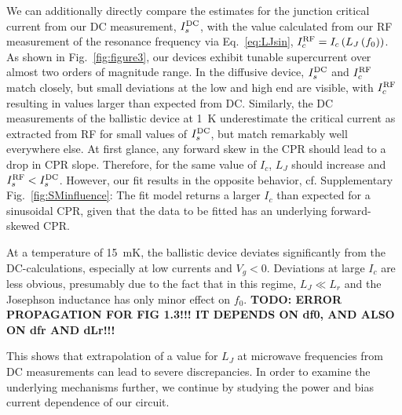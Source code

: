 We can additionally directly compare the estimates for the junction critical current from our DC measurement, $I_s^{\rm DC}$, with the value calculated from our RF measurement of the resonance frequency via Eq.~\ref{eq:LJsin}, $I_c^{\rm RF}=I_c\left(L_J\left(f_0\right)\right)$. 
%
As shown in Fig.~\ref{fig:figure3}, our devices exhibit tunable supercurrent over almost two orders of magnitude range.
%
In the diffusive device, $I_s^{\rm DC}$ and $I_c^{\rm RF}$ match closely, but small deviations at the low and high end are visible, with $I_c^{\rm RF}$ resulting in values larger than expected from DC.
%
Similarly, the DC measurements of the ballistic device at \SI{1}{\kelvin} underestimate the critical current as extracted from RF for small values of $I_s^{\rm DC}$, but match remarkably well everywhere else.
%
At first glance, any forward skew in the CPR should lead to a drop in CPR slope.
%
Therefore, for the same value of $I_c$, $L_J$ should increase and $I_s^{\rm RF}<I_s^{\rm DC}$.
%
However, our fit results in the opposite behavior, cf. Supplementary Fig.~\ref{fig:SMinfluence}:
%
The fit model returns a larger $I_c$ than expected for a sinusoidal CPR, given that the data to be fitted has an underlying forward-skewed CPR.

At a temperature of \SI{15}{\milli\kelvin}, the ballistic device deviates significantly from the DC-calculations, especially at low currents and $V_g<0$.
%
Deviations at large $I_c$ are less obvious, presumably due to the fact that in this regime, $L_J \ll L_r$ and the Josephson inductance has only minor effect on $f_0$. \textbf{TODO: ERROR PROPAGATION FOR FIG 1.3!!! IT DEPENDS ON df0, AND ALSO ON dfr AND dLr!!!}

This shows that extrapolation of a value for $L_J$ at microwave frequencies from DC measurements can lead to severe discrepancies.
%
In order to examine the underlying mechanisms further, we continue by studying the power and bias current dependence of our circuit.

